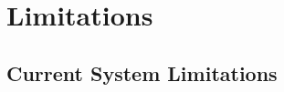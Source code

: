\chapter{Limitations}
\label{ch:limitations}

\section{Current System Limitations}
\label{sec:limitations-overview}

